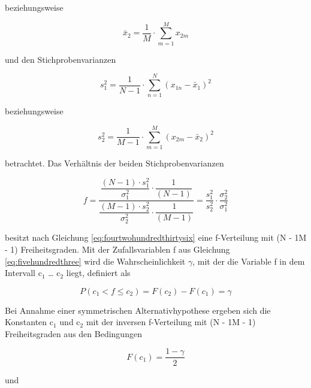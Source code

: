\noindent beziehungsweise

\begin{equation}\label{eq:sixonehundredfourtythree}
\bar{x}_{2} =\dfrac{1}{M} \cdot \sum _{m=1}^{M}x_{2m}
\end{equation}

\noindent und den Stichprobenvarianzen

\begin{equation}\label{eq:sixonehundredfourtyfour}
s_{1}^{2} =\dfrac{1}{N-1} \cdot \sum _{n=1}^{N}\left(x_{1n} -\bar{x}_{1} \right)^{2}
\end{equation}

\noindent beziehungsweise

\begin{equation}\label{eq:sixonehundredfourtyfive}
s_{2}^{2} =\dfrac{1}{M-1} \cdot \sum _{m=1}^{M}\left(x_{2m} -\bar{x}_{2} \right)^{2}
\end{equation}

\noindent betrachtet. Das Verh\"{a}ltnis der beiden Stichprobenvarianzen

\begin{equation}\label{eq:sixonehundredfourtysix}
f=\dfrac{\dfrac{(N-1)\cdot s_{1}^{2}}{\sigma _{1}^{2}} \cdot \dfrac{1}{(N-1)}}{\dfrac{(M-1)\cdot s_{2}^{2}}{\sigma _{2}^{2}} \cdot \dfrac{1}{(M-1)}} =\dfrac{s_{1}^{2}}{s_{2}^{2}} \cdot \dfrac{\sigma _{2}^{2}}{\sigma _{1}^{2}}
\end{equation}

\noindent besitzt nach Gleichung \eqref{eq:fourtwohundredthirtysix} eine f-Verteilung mit (N - 1{\textbar}M - 1) Freiheitsgraden. Mit der Zufallsvariablen f aus Gleichung \eqref{eq:fivehundredthree} wird die Wahrscheinlichkeit $\gamma$, mit der die Variable f in dem Intervall c$_{1}$ {\dots} c$_{2}$ liegt, definiert als

\begin{equation}\label{eq:sixonehundredfourtyseven}
P(c_{1} <f\le c_{2})=F(c_{2})-F(c_{1})=\gamma
\end{equation}

\noindent Bei Annahme einer symmetrischen Alternativhypothese ergeben sich die Konstanten c$_{1}$ und c$_{2}$ mit der inversen f-Verteilung mit (N - 1{\textbar}M - 1) Freiheitsgraden aus den Bedingungen

\begin{equation}\label{eq:sixonehundredfourtyeight}
F(c_{1})=\dfrac{1-\gamma}{2}
\end{equation}

\noindent und 

